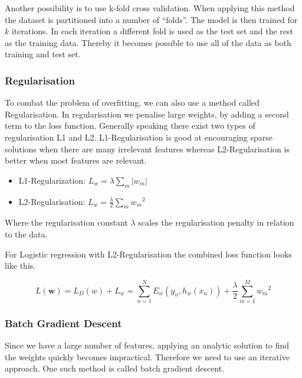 Another possibility is to use k-fold cross validation.
When applying this method the dataset is partitioned into a number of ``folds''.
The model is then trained for $k$ iterations.
In each iteration a different fold is used as the test set and the rest as the training data.
Thereby it becomes possible to use all of the data as both training and test set.
\begin{flushright}
\cite[p. 324]{AI2010}
\end{flushright}

\subsubsection{Regularisation}

To combat the problem of overfitting, we can also use a method called Regularisation.
In regularisation we penalise large weights, by adding a second term to the loss function.
Generally speaking there exist two types of regularisation L1 and L2.
L1-Regularisation is good at encouraging sparse solutions when there are many irrelevant features whereas L2-Regularisation is better when most features are relevant.

\begin{itemize}
\item L1-Regularization: $L_w = \lambda \sum_{m} \vert w_m \vert $ \\
\item L2-Regularisation: $L_w = \frac{\lambda}{2} \sum_{m} {w_m}^2$
\end{itemize}

Where the regularisation constant $\lambda$ scales the regularisation penalty in relation to the data. 

For Logistic regression with L2-Regularisation the combined loss function looks like this.

\[ L(\textbf{w})
  = L_D(w) + L_w 
  = \sum_{n=1}^N E_w(y_n, h_w(x_n)) + \frac{\lambda}{2} \sum_{m=1}^{M} {w_m}^2 \] 

\subsubsection{Batch Gradient Descent}\label{sec:batch}

Since we have a large number of features, applying an analytic solution to find the weights quickly becomes impractical.
Therefore we need to use an iterative approach.
One such method is called batch gradient descent.


